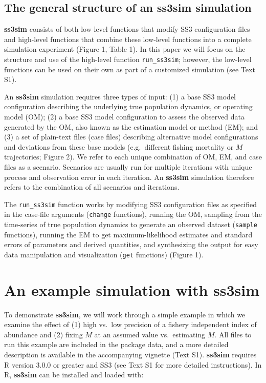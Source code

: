 \subsection*{The general structure of an ss3sim simulation}

\textbf{ss3sim} consists of both low-level functions that modify SS3
configuration files and high-level functions that combine these low-level
functions into a complete simulation experiment (Figure 1, Table 1). In this
paper we will focus on the structure and use of the high-level function
\texttt{run\_ss3sim}; however, the low-level functions can be used on their own
as part of a customized simulation (see Text S1).

An \textbf{ss3sim} simulation requires three types of input: (1) a base SS3
model configuration describing the underlying true population dynamics, or
operating model (OM); (2) a base SS3 model configuration to assess the observed
data generated by the OM, also known as the estimation model or method (EM);
and (3) a set of plain-text files (case files) describing alternative model
configurations and deviations from these base models (e.g.~different fishing
mortality or $M$ trajectories; Figure 2). We refer to each unique
combination of OM, EM, and case files as a scenario. Scenarios are usually run
for multiple iterations with unique process and observation error in each
iteration. An \textbf{ss3sim} simulation therefore refers to the combination of
all scenarios and iterations.

The \texttt{run\_ss3sim} function works by modifying SS3 configuration files as
specified in the case-file arguments (\texttt{change} functions), running the
OM, sampling from the time-series of true population dynamics to generate an
observed dataset (\texttt{sample} functions), running the EM to get
maximum-likelihood estimates and standard errors of parameters and
derived quantities, and synthesizing the output for easy data
manipulation and visualization (\texttt{get} functions) (Figure 1).

\section*{An example simulation with ss3sim}

To demonstrate \textbf{ss3sim}, we will work through a simple example in which
we examine the effect of (1) high vs.~low precision of a fishery independent
index of abundance and (2) fixing $M$ at an assumed value vs.~estimating
$M$. All files to run this example are included in the package data, and a more
detailed description is available in the accompanying vignette (Text S1).
\textbf{ss3sim} requires \textsf{R} version 3.0.0 or greater and SS3 (see Text
S1 for more detailed instructions). In \textsf{R}, \textbf{ss3sim} can be
installed and loaded with:


